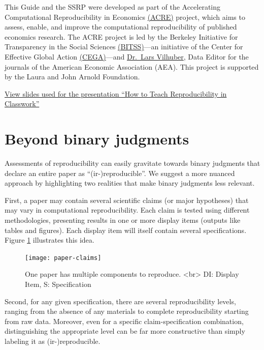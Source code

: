 \documentclass[
]{book}
\begin{document}
This Guide and the SSRP were developed as part of the Accelerating Computational Reproducibility in Economics \href{https://www.bitss.org/ecosystem/acre/}{(ACRE)} project, which aims to assess, enable, and improve the computational reproducibility of published economics research. The ACRE project is led by the Berkeley Initiative for Transparency in the Social Sciences \href{https://bitss.org}{(BITSS)}---an initiative of the Center for Effective Global Action \href{https://cega.berkeley.edu/}{(CEGA)}---and \href{https://www.vilhuber.com/lars/}{Dr.~Lars Vilhuber}, Data Editor for the journals of the American Economic Association (AEA). This project is supported by the Laura and John Arnold Foundation.

\href{https://bitss.github.io/WEAI2020_slides/}{View slides used for the presentation ``How to Teach Reproducibility in Classwork''}

\hypertarget{beyond-binary-judgments}{%
\section*{Beyond binary judgments}\label{beyond-binary-judgments}}

Assessments of reproducibility can easily gravitate towards binary judgments that declare an entire paper as ``(ir-)reproducible''. We suggest a more nuanced approach by highlighting two realities that make binary judgments less relevant.

First, a paper may contain several scientific claims (or major hypotheses) that may vary in computational reproducibility. Each claim is tested using different methodologies, presenting results in one or more display items (outputs like tables and figures). Each display item will itself contain several specifications. Figure \ref{fig:diagram} illustrates this idea.

\begin{figure}
\texttt{[image: paper-claims]} \caption{One paper has multiple components to reproduce. <br> DI: Display Item, S: Specification }\label{fig:diagram}
\end{figure}

Second, for any given specification, there are several reproducibility levels, ranging from the absence of any materials to complete reproducibility starting from raw data. Moreover, even for a specific claim-specification combination, distinguishing the appropriate level can be far more constructive than simply labeling it as (ir-)reproducible.
\end{document}
